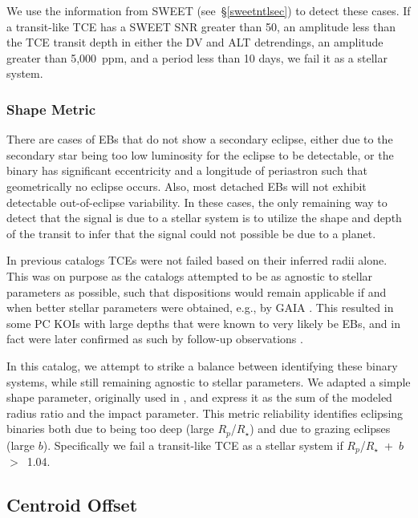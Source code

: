 We use the information from SWEET (see~\S\ref{sweetntlsec}) to detect these cases. If a transit-like TCE has a SWEET SNR greater than 50, an amplitude less than the TCE transit depth in either the DV and ALT detrendings, an amplitude greater than 5,000~ppm, and a period less than 10 days, we fail it as a stellar system.



\subsubsection{Shape Metric}

There are cases of EBs that do not show a secondary eclipse, either due to the secondary star being too low luminosity for the eclipse to be detectable, or the binary has significant eccentricity and a longitude of periastron such that geometrically no eclipse occurs. Also, most detached EBs will not exhibit detectable out-of-eclipse variability. In these cases, the only remaining way to detect that the signal is due to a stellar system is to utilize the shape and depth of the transit to infer that the signal could not possible be due to a planet.

In previous catalogs \citep{Rowe2015cat,Mullally2015cat,Coughlin2016} TCEs were not failed based on their inferred radii alone. This was on purpose as the catalogs attempted to be as agnostic to stellar parameters as possible, such that dispositions would remain applicable if and when better stellar parameters were obtained, e.g., by GAIA \citep{Cacciari2009,Mignard2005}. This resulted in some PC KOIs with large depths that were known to very likely be EBs, and in fact were later confirmed as such by follow-up observations \citep{Santerne2016}.

In this catalog, we attempt to strike a balance between identifying these binary systems, while still remaining agnostic to stellar parameters. We adapted a simple shape parameter, originally used in \citet{Batalha2013}, and express it as the sum of the modeled radius ratio and the impact parameter. This metric reliability identifies eclipsing binaries both due to being too deep (large $R_{p}$/$R_{\star}$) and due to grazing eclipses (large $b$). Specifically we fail a transit-like TCE as a stellar system if $R_{p}$/$R_{\star}$~+~$b$~$>$~1.04.



\subsection{Centroid Offset}

